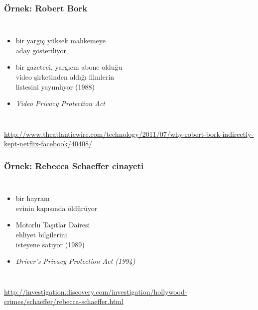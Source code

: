 \documentclass[dvipsnames]{beamer}
\theoremstyle{definition}
\theoremstyle{example}
\theoremstyle{plain}
\begin{document}
\begin{frame}
  \frametitle{Örnek: Robert Bork}

  \begin{columns}

    \begin{itemize}
      \item bir yargıç yüksek mahkemeye\\
        aday gösteriliyor
      \item bir gazeteci, yargıcın abone olduğu\\
        video şirketinden aldığı filmlerin\\
        listesini yayımlıyor (1988)

      \medskip
      \item \emph{Video Privacy Protection Act}
    \end{itemize}
  \end{columns}

  \medskip
  \tiny{\url{http://www.theatlanticwire.com/technology/2011/07/why-robert-bork-indirectly-kept-netflix-facebook/40408/}}\\
\end{frame}

\begin{frame}
  \frametitle{Örnek: Rebecca Schaeffer cinayeti}

  \begin{columns}

    \begin{itemize}
      \item bir hayranı\\
        evinin kapısında öldürüyor
      \item Motorlu Taşıtlar Dairesi\\
        ehliyet bilgilerini\\
        isteyene satıyor (1989)

      \medskip
      \item \emph{Driver's Privacy Protection Act (1994)}
    \end{itemize}
  \end{columns}

  \medskip
  \tiny{\url{http://investigation.discovery.com/investigation/hollywood-crimes/schaeffer/rebecca-schaeffer.html}}\\
\end{frame}
\end{document}
